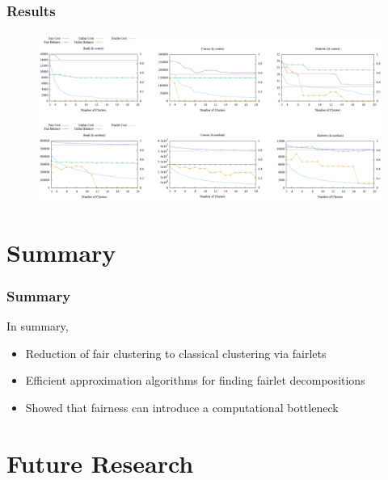 \documentclass{beamer}
\begin{document}


\begin{frame}
\frametitle{Results}

\begin{figure}[hbt]
  \includegraphics[height=5.5cm]{fig4.png}
\end{figure}

\end{frame}


\section{Summary}

\begin{frame}
\frametitle{Summary}

In summary, \pause

\begin{itemize}
	\item Reduction of fair clustering to classical clustering via fairlets \pause

	\item Efficient approximation algorithms for finding fairlet decompositions \pause

	\item Showed that fairness can introduce a computational bottleneck
\end{itemize}

\end{frame}


\section{Future Research}
\end{document}
